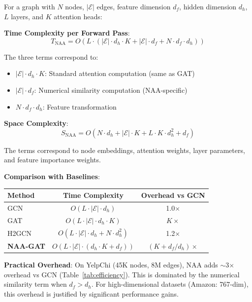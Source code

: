 \begin{proposition}
\label{prop:complexity}
For a graph with $N$ nodes, $|\mathcal{E}|$ edges, feature dimension $d_f$, hidden dimension $d_h$, $L$ layers, and $K$ attention heads:

\textbf{Time Complexity per Forward Pass}:
\begin{equation}
T_{\text{NAA}} = O\left(L \cdot \left(|\mathcal{E}| \cdot d_h \cdot K + |\mathcal{E}| \cdot d_f + N \cdot d_f \cdot d_h\right)\right)
\end{equation}

The three terms correspond to:
\begin{itemize}
\item $|\mathcal{E}| \cdot d_h \cdot K$: Standard attention computation (same as GAT)
\item $|\mathcal{E}| \cdot d_f$: Numerical similarity computation (NAA-specific)
\item $N \cdot d_f \cdot d_h$: Feature transformation
\end{itemize}

\textbf{Space Complexity}:
\begin{equation}
S_{\text{NAA}} = O\left(N \cdot d_h + |\mathcal{E}| \cdot K + L \cdot K \cdot d_h^2 + d_f\right)
\end{equation}

The terms correspond to node embeddings, attention weights, layer parameters, and feature importance weights.
\end{proposition}

\textbf{Comparison with Baselines}:

\begin{table}[h]
\centering
\small
\begin{tabular}{lcc}
\toprule
\textbf{Method} & \textbf{Time Complexity} & \textbf{Overhead vs GCN} \\
\midrule
GCN & $O(L \cdot |\mathcal{E}| \cdot d_h)$ & 1.0$\times$ \\
GAT & $O(L \cdot |\mathcal{E}| \cdot d_h \cdot K)$ & $K\times$ \\
H2GCN & $O(L \cdot |\mathcal{E}| \cdot d_h + N \cdot d_h^2)$ & 1.2$\times$ \\
\textbf{NAA-GAT} & $O(L \cdot |\mathcal{E}| \cdot (d_h \cdot K + d_f))$ & $(K + d_f/d_h)\times$ \\
\bottomrule
\end{tabular}
\end{table}

\textbf{Practical Overhead}: On YelpChi (45K nodes, 8M edges), NAA adds $\sim$3$\times$ overhead vs GCN (Table~\ref{tab:efficiency}). This is dominated by the numerical similarity term when $d_f > d_h$. For high-dimensional datasets (Amazon: 767-dim), this overhead is justified by significant performance gains.
